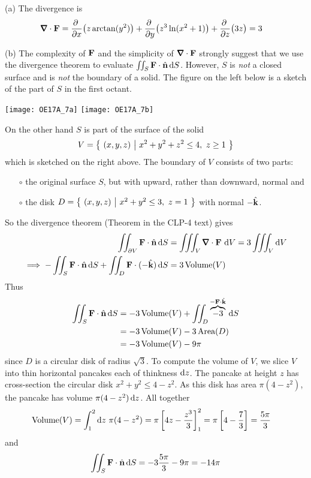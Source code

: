 \begin{solution} (a) The divergence is
\begin{align*}
\vnabla\cdot\vF
&=\pdiff{}{x}\big(z \arctan(y^2)\big)
      +  \pdiff{}{y}\big(z^3 \ln(x^2 + 1)\big)
      +  \pdiff{}{z}\big(3z\big) 
= 3
\end{align*}

(b) The complexity of $\mathbf{F}$ and the simplicity of $\vnabla\cdot\vF$
strongly suggest that we use the divergence theorem to evaluate
$\iint_S \mathbf{F} \cdot\hat{\mathbf{n}}\,\mathrm{d}S$. However, $S$ is \emph{not} a closed
surface and is \emph{not} the boundary of a solid. The figure on the left below
is a sketch of the part of $S$ in the first octant.
\begin{center}
     \texttt{[image: OE17A\_7a]}\qquad
     \texttt{[image: OE17A\_7b]}
\end{center}
On the other hand $S$ is part of the surface of the solid
\begin{equation*}
V=\big\{ \ (x,y,z)\ \big|\ x^2+y^2+z^2\le 4,\ z\ge 1\ \big\}
\end{equation*}
which is sketched on the right above. The boundary of $V$ consists of two parts:
\begin{itemize}\itemsep1pt \parskip0pt  %
\item[$\circ$]
the original surface $S$, but with upward, rather than downward, normal and
\item[$\circ$]
the disk $D=\Set{(x,y,z)}{ x^2+y^2\le 3,\ z=1}$ with normal $-\hat{\mathbf{k}}$.
\end{itemize}
So the divergence theorem (Theorem  in the 
CLP-4 text) gives
\begin{align*}
   \dblInt_{\partial V}\vF\cdot\hn\,\dee{S} 
           &= \tripInt_V\vnabla\cdot\vF\ \dee{V}
           = 3 \tripInt_V \dee{V} \\
\implies
  -\dblInt_S\vF\cdot\hn\,\dee{S} +\dblInt_D\vF\cdot(-\hk)\,\dee{S} 
           &=3\,\text{Volume}(V)
\end{align*}
Thus
\begin{align*}
\iint_S\mathbf{F}\cdot\hat{\mathbf{n}}\,\mathrm{d}S &= -3\,\text{Volume}(V)
                      + \iint_D\overbrace{-3}^{-\mathbf{F}\cdot\hat{\mathbf{k}}}\,\mathrm{d}S \\
&= -3\,\text{Volume}(V) -3\,\text{Area}(D) \\
&= -3\,\text{Volume}(V) -9\pi
\end{align*}
since $D$ is a circular disk of radius $\sqrt{3}$. To compute the volume
of $V$, we slice $V$ into thin horizontal pancakes each of thinkness $\mathrm{d}z$. 
The pancake at height $z$ has cross-section the circular disk 
$x^2+y^2\le 4-z^2$. As this disk has area $\pi(4-z^2)$, the pancake has volume 
$\pi(4-z^2)\,\mathrm{d}z$. All together
\begin{align*}
\text{Volume}(V)
&=\int_1^2\mathrm{d}z\ \pi(4-z^2)
=\pi\left[4z-\frac{z^3}{3}\right]_1^2
=\pi\left[4-\frac{7}{3}\right]
=\frac{5\pi}{3}
\end{align*}
and
\begin{equation*}
\iint_S\mathbf{F}\cdot\hat{\mathbf{n}}\,\mathrm{d}S =-3\frac{5\pi}{3}-9\pi
=-14\pi
\end{equation*}
\end{solution}

